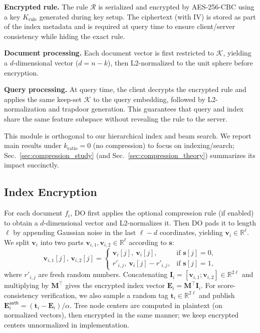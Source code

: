 \documentclass[journal]{IEEEtran}
\begin{document}
\textbf{Encrypted rule.} The rule $\mathcal{R}$ is serialized and encrypted by AES-256-CBC using a key $K_\text{rule}$ generated during key setup. The ciphertext (with IV) is stored as part of the index metadata and is required at query time to ensure client/server consistency while hiding the exact rule.

\textbf{Document processing.} Each document vector is first restricted to $\mathcal{K}$, yielding a $d$-dimensional vector ($d=n-k$), then L2-normalized to the unit sphere before encryption.

\textbf{Query processing.} At query time, the client decrypts the encrypted rule and applies the same keep-set $\mathcal{K}$ to the query embedding, followed by L2-normalization and trapdoor generation. This guarantees that query and index share the same feature subspace without revealing the rule to the server.

This module is orthogonal to our hierarchical index and beam search. We report main results under $k_\text{ratio}=0$ (no compression) to focus on indexing/search; Sec.~\ref{sec:compression_study} (and Sec.~\ref{sec:compression_theory}) summarizes its impact succinctly.

\subsection{Index Encryption}

For each document $f_i$, DO first applies the optional compression rule (if enabled) to obtain a $d$-dimensional vector and L2-normalizes it. Then DO pads it to length $\ell$ by appending Gaussian noise in the last $\ell-d$ coordinates, yielding $\mathbf{v}_i\in\mathbb{R}^{\ell}$. We split $\mathbf{v}_i$ into two parts $\mathbf{v}_{i,1},\mathbf{v}_{i,2}\in\mathbb{R}^{\ell}$ according to $\mathbf{s}$:
\begin{equation}
\mathbf{v}_{i,1}[j],\,\mathbf{v}_{i,2}[j]=\begin{cases}
\mathbf{v}_i[j],\ \mathbf{v}_i[j], & \text{if } \mathbf{s}[j]=0,\\
r'_{i,j},\ \mathbf{v}_i[j]-r'_{i,j}, & \text{if } \mathbf{s}[j]=1,
\end{cases}
\end{equation}
where $r'_{i,j}$ are fresh random numbers. Concatenating $\mathbf{I}_i=[\mathbf{v}_{i,1};\mathbf{v}_{i,2}]\in\mathbb{R}^{2\ell}$ and multiplying by $\mathbf{M}^{\top}$ gives the encrypted index vector $\mathbf{E}_i=\mathbf{M}^{\top}\mathbf{I}_i$. For score-consistency verification, we also sample a random tag $\mathbf{t}_i\in\mathbb{R}^{2\ell}$ and publish $\mathbf{E}_i^{\mathsf{auth}}=(\mathbf{t}_i-\mathbf{E}_i)/\alpha$. Tree node centers are computed in plaintext (on normalized vectors), then encrypted in the same manner; we keep encrypted centers unnormalized in implementation.
\end{document}

